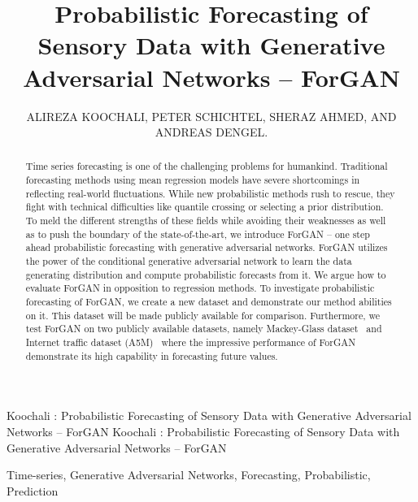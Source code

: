 \documentclass{ieeeaccess}
\begin{document}
\doi{}

\title{Probabilistic Forecasting of Sensory Data with Generative Adversarial Networks -- ForGAN}
\author{\uppercase{Alireza Koochali,
Peter Schichtel, Sheraz Ahmed, and Andreas Dengel}.}
\address[1]{Department of Computer Science, University of Kaiserslautern, 67663 Germany}
\address[2]{Ingenieurgesellschaft Auto und Verkehr (IAV), Kaiserslautern, 67663 Germany}
\address[3]{German Research Center for Artificial Intelligence (DFKI), Kaiserslautern, 67663 Germany}



\markboth
{Koochali \headeretal: Probabilistic Forecasting of Sensory Data with Generative Adversarial Networks -- ForGAN}
{Koochali \headeretal: Probabilistic Forecasting of Sensory Data with Generative Adversarial Networks -- ForGAN}


\begin{abstract}
Time series forecasting is one of the challenging problems for humankind. Traditional forecasting methods using mean regression models have severe shortcomings in reflecting real-world fluctuations. While new probabilistic methods rush to rescue, they fight with technical difficulties like quantile crossing or selecting a prior distribution. To meld the different strengths of these fields while avoiding their weaknesses as well as to push the boundary of the state-of-the-art, we introduce ForGAN – one step ahead probabilistic forecasting with generative adversarial networks. ForGAN utilizes the power of the conditional generative adversarial network to learn the data generating distribution and compute probabilistic forecasts from it. We argue how to evaluate ForGAN in opposition to regression methods. To investigate probabilistic forecasting of ForGAN, we create a new dataset and demonstrate our method abilities on it. This dataset will be made publicly available for comparison. Furthermore, we test ForGAN on two publicly available datasets, namely Mackey-Glass dataset~\cite{mackey1977oscillation} and Internet traffic dataset (A5M)~\cite{cortez2012multi} where the impressive performance of ForGAN demonstrate its high capability in forecasting future values.
\end{abstract}

\begin{keywords}
Time-series, Generative Adversarial Networks, Forecasting, Probabilistic, Prediction
\end{keywords}
\end{document}
